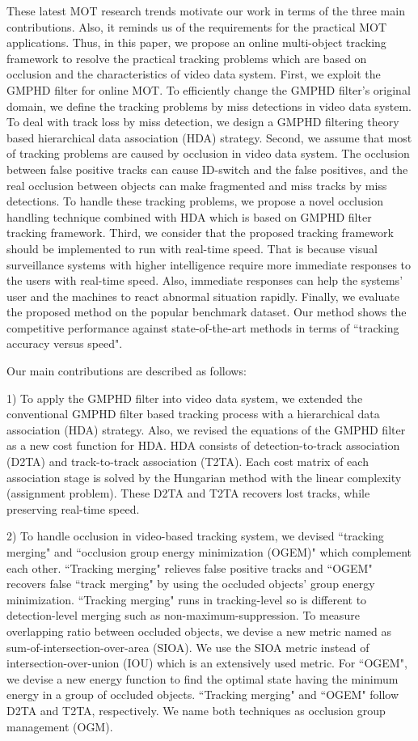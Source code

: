 \documentclass[journal]{IEEEtran}
\newcounter{ct}
\begin{document}
These latest MOT research trends motivate our work in terms of the three main contributions.
Also, it reminds us of the requirements for the practical MOT applications.
Thus, in this paper, we propose an online multi-object tracking framework to resolve the practical tracking problems which are based on occlusion and the characteristics of video data system.
First, we exploit the GMPHD filter for online MOT. To efficiently change the GMPHD filter's original domain, we define the tracking problems by miss detections in video data system. To deal with track loss by miss detection, we design a GMPHD filtering theory based hierarchical data association (HDA) strategy.
Second, we assume that most of tracking problems are caused by occlusion in video data system. The occlusion between false positive tracks can cause ID-switch and the false positives, and the real occlusion between objects can make fragmented and miss tracks by miss detections. To handle these tracking problems, we propose a novel occlusion handling technique combined with HDA which is based on GMPHD filter tracking framework.
Third, we consider that the proposed tracking framework should be implemented to run with real-time speed.
That is because visual surveillance systems with higher intelligence require more immediate responses to the users with real-time speed. Also, immediate responses can help the systems' user and the machines to react abnormal situation rapidly.
Finally, we evaluate the proposed method on the popular benchmark dataset. Our method shows the competitive performance against state-of-the-art methods in terms of ``tracking accuracy versus speed".

Our main contributions are described as follows:

1) To apply the GMPHD filter into video data system, we extended the conventional GMPHD filter based tracking process with a hierarchical data association (HDA) strategy. Also, we revised the equations of the GMPHD filter as a new cost function for HDA. HDA consists of detection-to-track association (D2TA) and track-to-track association (T2TA). Each cost matrix of each association stage is solved by the Hungarian method with the linear complexity  (assignment problem). These D2TA and T2TA recovers lost tracks, while preserving real-time speed.

2) To handle occlusion in video-based tracking system, we devised ``tracking merging" and ``occlusion group energy minimization (OGEM)" which complement each other. ``Tracking merging" relieves false positive tracks and ``OGEM" recovers false ``track merging" by using the occluded objects' group energy minimization. ``Tracking merging" runs in tracking-level so is different to detection-level merging such as non-maximum-suppression. To measure overlapping ratio between occluded objects, we devise a new metric named as sum-of-intersection-over-area (SIOA). We use the SIOA metric instead of intersection-over-union (IOU) which is an extensively used metric.
For ``OGEM", we devise a new energy function to find the optimal state having the minimum energy in a group of occluded objects. ``Tracking merging" and ``OGEM" follow D2TA and T2TA, respectively. We name both techniques as occlusion group management (OGM).
\end{document}
